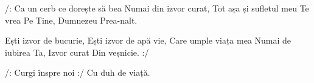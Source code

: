 \beginverse
/: Ca un cerb ce dorește să bea
Numai din izvor curat,
Tot așa și sufletul meu Te vrea
Pe Tine, Dumnezeu Prea-nalt.
\endverse

\beginchorus
Ești izvor de bucurie,
Ești izvor de apă vie,
Care umple viața mea
Numai de iubirea Ta,
Izvor curat
Din veșnicie. :/
\endchorus

\beginverse*
/: Curgi înspre noi :/
Cu duh de viață.
\endverse
\endsong